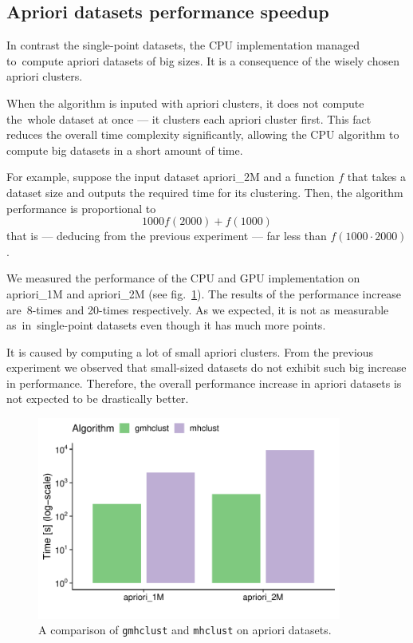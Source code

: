 \subsection{Apriori datasets performance speedup}

In contrast  the single-point datasets, the CPU implementation managed to~compute apriori datasets of big sizes. It is a consequence of the wisely chosen apriori clusters.

When the algorithm is inputed with apriori clusters, it does not compute the~whole dataset at once --- it clusters each apriori cluster first. This fact reduces the overall time complexity significantly, allowing the CPU algorithm to compute big datasets in a short amount of time.

For example, suppose the input dataset apriori\_2M and a function $f$ that takes a dataset size and outputs the required time for its clustering. Then, the algorithm performance is proportional to $$1000f(2000)+f(1000)$$ that is --- deducing from the previous experiment --- far less than $f(1000\cdot 2000)$.

We measured the performance of the CPU and GPU implementation on apriori\_1M and apriori\_2M (see fig.~\ref{fig04:apr_perf_comp}). The results of the performance increase are~8-times and 20-times respectively. As we expected, it is not as measurable as~in~single-point datasets even though it has much more points. 

It is caused by computing a lot of small apriori clusters. From the previous experiment we observed that small-sized datasets do not exhibit such big increase in performance. Therefore, the overall performance increase in apriori datasets is not expected to be drastically better.

\begin{figure}\centering
	\includegraphics[width=10cm]{img/apriori_perf_comp}
	\caption{A comparison of \texttt{gmhclust} and \texttt{mhclust} on apriori datasets.}
	\label{fig04:apr_perf_comp}
\end{figure}

